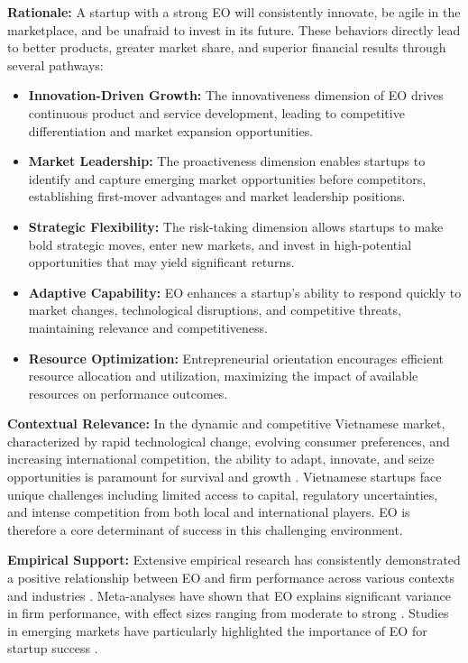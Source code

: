 \documentclass[../Main.tex]{subfiles}
\begin{document}
    \textbf{Rationale:} A startup with a strong EO will consistently innovate, be agile in the marketplace, and be unafraid to invest in its future. These behaviors directly lead to better products, greater market share, and superior financial results through several pathways:
    \begin{itemize}
        \item \textbf{Innovation-Driven Growth:} The innovativeness dimension of EO drives continuous product and service development, leading to competitive differentiation and market expansion opportunities.
        \item \textbf{Market Leadership:} The proactiveness dimension enables startups to identify and capture emerging market opportunities before competitors, establishing first-mover advantages and market leadership positions.
        \item \textbf{Strategic Flexibility:} The risk-taking dimension allows startups to make bold strategic moves, enter new markets, and invest in high-potential opportunities that may yield significant returns.
        \item \textbf{Adaptive Capability:} EO enhances a startup's ability to respond quickly to market changes, technological disruptions, and competitive threats, maintaining relevance and competitiveness.
        \item \textbf{Resource Optimization:} Entrepreneurial orientation encourages efficient resource allocation and utilization, maximizing the impact of available resources on performance outcomes.
    \end{itemize}
    
    \textbf{Contextual Relevance:} In the dynamic and competitive Vietnamese market, characterized by rapid technological change, evolving consumer preferences, and increasing international competition, the ability to adapt, innovate, and seize opportunities is paramount for survival and growth \cite{vietnam_innovation_report_2024}. Vietnamese startups face unique challenges including limited access to capital, regulatory uncertainties, and intense competition from both local and international players. EO is therefore a core determinant of success in this challenging environment.
    
    \textbf{Empirical Support:} Extensive empirical research has consistently demonstrated a positive relationship between EO and firm performance across various contexts and industries \cite{rauch2009entrepreneurial}. Meta-analyses have shown that EO explains significant variance in firm performance, with effect sizes ranging from moderate to strong \cite{saeed2014entrepreneurial}. Studies in emerging markets have particularly highlighted the importance of EO for startup success \cite{wales2013entrepreneurial}.
    
\end{document}
